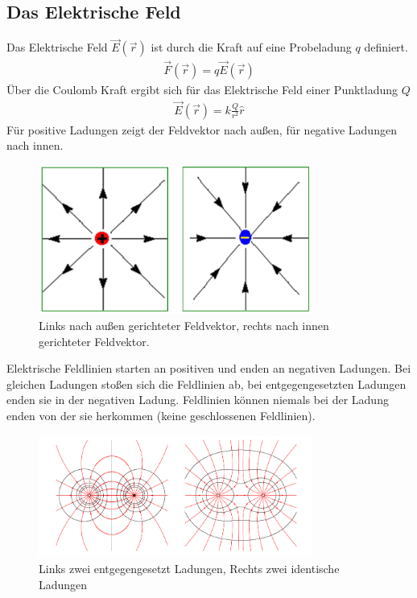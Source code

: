 \documentclass{scrartcl}
\begin{document}
\subsection{Das Elektrische Feld}
Das Elektrische Feld $\vec{E}(\vec{r})$ ist durch die Kraft auf eine Probeladung $q$ definiert.
\begin{align}
    \vec{F}(\vec{r})=q\vec{E}(\vec{r})
\end{align}
Über die Coulomb Kraft ergibt sich für das Elektrische Feld einer Punktladung $Q$
\begin{align}
    \vec{E}(\vec{r})=k\frac{Q}{r^2}\hat{r}
\end{align}
Für positive Ladungen zeigt der Feldvektor nach außen, für negative Ladungen nach innen.
\begin{figure}[H]
    \centering
    \includegraphics[width=0.80\textwidth]{Elektrisches Feld .png}
    \caption{Links nach außen gerichteter Feldvektor, rechts nach innen gerichteter Feldvektor.}
\end{figure}
Elektrische Feldlinien starten an positiven und enden an negativen Ladungen. 
Bei gleichen Ladungen stoßen sich die Feldlinien ab, bei entgegengesetzten Ladungen enden sie in der negativen Ladung.
Feldlinien können niemals bei der Ladung enden von der sie herkommen (keine geschlossenen Feldlinien).
\begin{figure}[H]
    \centering
    \includegraphics[width=0.80\textwidth]{Elektrisches Feld Ladungen.png}
    \caption{Links zwei entgegengesetzt Ladungen, Rechts zwei identische Ladungen}
\end{figure}
\end{document}
